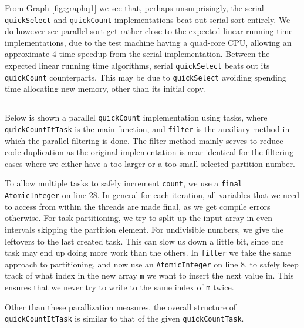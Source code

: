 \documentclass[a5paper]{article}
\begin{document}
From Graph \ref{fig:graphq1} we see that, perhaps unsurprisingly, the serial \texttt{quickSelect} and \texttt{quickCount} implementations beat out serial sort entirely.
We do however see parallel sort get rather close to the expected linear running time implementations, due to the test machine having a quad-core CPU,
allowing an approximate 4 time speedup from the serial implementation. Between the expected linear running time algorithms, serial \texttt{quickSelect} beats out its \texttt{quickCount} counterparts. This may be due to \texttt{quickSelect} avoiding spending time allocating new memory, other than its initial copy.

\subsection{}
Below is shown a parallel \texttt{quickCount} implementation using tasks, where \texttt{quickCountItTask} is the main function, and \texttt{filter} is the auxiliary method
in which the parallel filtering is done. The filter method mainly serves to reduce code duplication as the original implementation is near identical
for the filtering cases where we either have a too larger or a too small selected partition number.

To allow multiple tasks to safely increment \texttt{count}, we use a \texttt{final AtomicInteger} on line 28. In general for each iteration, all variables that we need to access
from within the threads are made final, as we get compile errors otherwise. For task partitioning, we try to split up the input array in even intervals skipping the partition element. For undivisible numbers,
we give the leftovers to the last created task. This can slow us down a little bit, since one task may end up doing more work than the others. In \texttt{filter} we take the same
approach to partitioning, and now use an \texttt{AtomicInteger} on line 8, to safely keep track of what index in the new array \texttt{m} we want to insert the next value in. This ensures that
we never try to write to the same index of \texttt{m} twice.

Other than these parallization measures, the overall structure of \texttt{quickCountItTask} is similar to that of the given \texttt{quickCountTask}.
\end{document}
